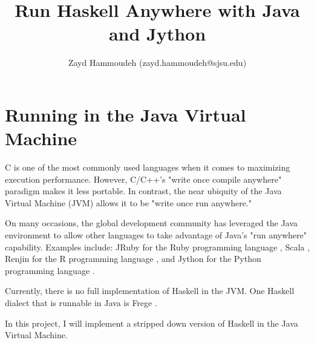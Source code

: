 \documentclass{article}
\title{Run Haskell Anywhere with Java and Jython}
\author{
  Zayd Hammoudeh
  (zayd.hammoudeh@sjsu.edu)
  }
\begin{document}
\maketitle

\section{Running in the Java Virtual Machine}

C is one of the most commonly used languages when it comes to maximizing execution performance.  However, C/C++'s "write once compile anywhere" paradigm makes it less portable.  In contrast, the near ubiquity of the Java Virtual Machine (JVM) allows it to be "write once run anywhere."  

On many occasions, the global development community has leveraged the Java environment to allow other languages to take advantage of Java's "run anywhere" capability.  Examples include: JRuby for the Ruby programming language \cite{jruby}, Scala \cite{scala}, Renjin for the R programming language \cite{renjin}, and Jython for the Python programming language \cite{jython_jvm}.

Currently, there is no full implementation of Haskell in the JVM.  One Haskell dialect that is runnable in Java is Frege \cite{frege}.  

In this project, I will implement a stripped down version of Haskell in the Java Virtual Machine.  

%


\end{document}
